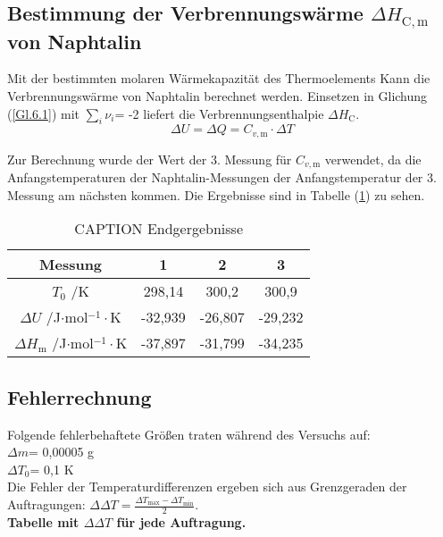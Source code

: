 \documentclass[12pt,a4paper,titlepage,headinclude,bibtotoc]{scrartcl}
\begin{document}
\subsection{Bestimmung der Verbrennungswärme $\Delta H_\mathrm{C,m}$ von Naphtalin}

Mit der bestimmten molaren Wärmekapazität des Thermoelements Kann die Verbrennungswärme von Naphtalin berechnet werden. Einsetzen in Glichung (\ref{Gl.6.1}) mit $\sum_i \nu_i$= -2 liefert die Verbrennungsenthalpie $\Delta H_\mathrm{C}$.\\

\begin{equation}
\Delta U= \Delta Q= C_{v,\mathrm{m}}\cdot \Delta T
\end{equation}

Zur Berechnung wurde der Wert der 3. Messung für $C_{v,\mathrm{m}}$ verwendet, da die Anfangstemperaturen der Naphtalin-Messungen der Anfangstemperatur der 3. Messung am nächsten kommen. Die Ergebnisse sind in Tabelle (\ref{Endergebnisse}) zu sehen.\\

\begin{table} \caption{CAPTION Endgergebnisse} \label{Endergebnisse}
\begin{tabular}{c|c|c|c}
Messung & 1 & 2 & 3 \\ 
\hline 
$T_0$ /K &298,14&300,2&300,9\\
\hline 
$\Delta U$ /J$\cdot$mol$^{-1}\cdot$K &-32,939&-26,807&-29,232\\ 
\hline 
$\Delta H_\mathrm{m}$ /J$\cdot$mol$^{-1}\cdot$K &-37,897&-31,799&-34,235\\
\end{tabular} 
\end{table}
\FloatBarrier

\subsection{Fehlerrechnung}
Folgende fehlerbehaftete Größen traten während des Versuchs auf:\\
 $\Delta m$= 0,00005 g\\
 $\Delta T_0$= 0,1 K\\
 
Die Fehler der Temperaturdifferenzen ergeben sich aus Grenzgeraden der Auftragungen: $\Delta \Delta T= \frac{\Delta T_\mathrm{max}-\Delta T_\mathrm{min}}{2} $.\\

\textbf{Tabelle mit $\Delta \Delta T$ für jede Auftragung.}\\
\end{document}
